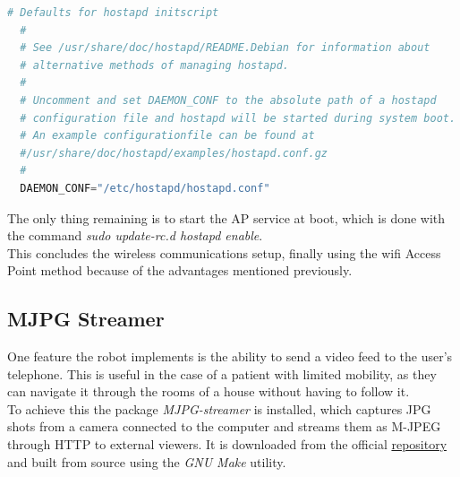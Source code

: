 	\begin{minipage}{\linewidth}%
	\begin{lstlisting}[label=ap-default,caption=AP Defaults {[} /etc/default/hostapd {]} ,language=python  ]
  # Defaults for hostapd initscript
  #
  # See /usr/share/doc/hostapd/README.Debian for information about
  # alternative methods of managing hostapd.
  #
  # Uncomment and set DAEMON_CONF to the absolute path of a hostapd 
  # configuration file and hostapd will be started during system boot. 
  # An example configurationfile can be found at 
  #/usr/share/doc/hostapd/examples/hostapd.conf.gz
  #
  DAEMON_CONF="/etc/hostapd/hostapd.conf"

	\end{lstlisting}
	\end{minipage}

\bigskip
The only thing remaining is to start the AP service at boot, which is done with the command \textit{sudo update-rc.d hostapd enable}.\\


This concludes the wireless communications setup, finally using the wifi Access Point method because of the advantages mentioned previously.











\subsection{MJPG Streamer}

One feature the robot implements is the ability to send a video feed to the user's telephone. This is useful in the case of a patient with limited mobility, as they can navigate it through the rooms of a house without having to follow it.\\

To achieve this the package \textit{MJPG-streamer} is installed, which captures JPG shots from a camera connected to the computer and streams them as M-JPEG through HTTP to external viewers. It is downloaded from the official \href{http://sourceforge.net/projects/mjpg-streamer/?source=navbar}{repository} and built from source using the \textit{GNU Make} utility.\\

